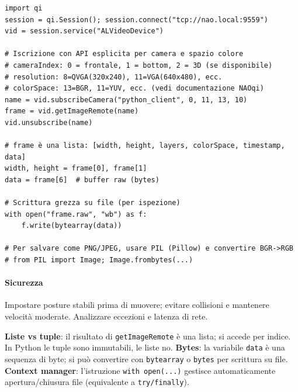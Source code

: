 \begin{tcolorbox}[title=Acquisizione immagini]
\begin{lstlisting}
import qi
session = qi.Session(); session.connect("tcp://nao.local:9559")
vid = session.service("ALVideoDevice")

# Iscrizione con API esplicita per camera e spazio colore
# cameraIndex: 0 = frontale, 1 = bottom, 2 = 3D (se disponibile)
# resolution: 8=QVGA(320x240), 11=VGA(640x480), ecc.
# colorSpace: 13=BGR, 11=YUV, ecc. (vedi documentazione NAOqi)
name = vid.subscribeCamera("python_client", 0, 11, 13, 10)
frame = vid.getImageRemote(name)
vid.unsubscribe(name)

# frame è una lista: [width, height, layers, colorSpace, timestamp, data]
width, height = frame[0], frame[1]
data = frame[6]  # buffer raw (bytes)

# Scrittura grezza su file (per ispezione)
with open("frame.raw", "wb") as f:
    f.write(bytearray(data))

# Per salvare come PNG/JPEG, usare PIL (Pillow) e convertire BGR->RGB
# from PIL import Image; Image.frombytes(...)
\end{lstlisting}
\end{tcolorbox}

\paragraph{Sicurezza} Impostare posture stabili prima di muovere; evitare collisioni e mantenere velocità moderate. Analizzare eccezioni e latenza di rete.

\begin{tcolorbox}[title=Spiegazioni per non-Python]
\textbf{Liste vs tuple}: il risultato di \texttt{getImageRemote} è una lista; si accede per indice. In Python le tuple sono immutabili, le liste no.  
\textbf{Bytes}: la variabile \texttt{data} è una sequenza di byte; si può convertire con \texttt{bytearray} o \texttt{bytes} per scrittura su file.  
\textbf{Context manager}: l'istruzione \texttt{with open(...)} gestisce automaticamente apertura/chiusura file (equivalente a \texttt{try/finally}).
\end{tcolorbox}

